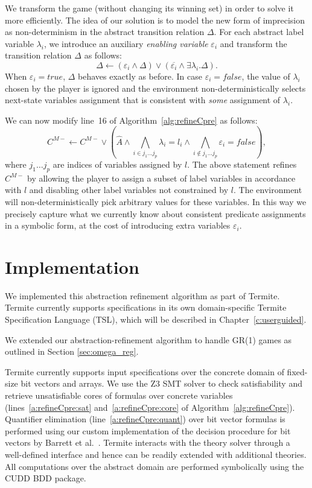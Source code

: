 We transform the game (without changing its winning set) in order to solve it more efficiently.  The idea of our solution is to model the new form of imprecision as non-determinism in the abstract transition relation $\Delta$.  For each abstract label variable $\lambda_i$, we introduce an auxiliary \emph{enabling variable} $\varepsilon_i$ and transform the transition relation $\Delta$ as follows:
$$
\Delta \gets (\varepsilon_i \land \Delta) \lor (\overline{\varepsilon_i} \land \exists \lambda_i. \Delta).
$$
When $\varepsilon_i=true$, $\Delta$ behaves exactly as before.  In case $\varepsilon_i=false$, the value of $\lambda_i$ chosen by the player is ignored and the environment non-deterministically selects next-state variables assignment that is consistent with \emph{some} assignment of $\lambda_i$. 

We can now modify line~16 of Algorithm~\ref{alg:refineCpre} as follows:
$$
C^{M-} \gets C^{M-} \lor (\hat{A}\land \bigwedge_{i\in{j_1\ldots j_p}}\lambda_i=l_i \land \bigwedge_{i\not\in{j_1\ldots j_p}}\varepsilon_i=false),
$$
where $j_1\ldots j_p$ are indices of variables assigned by $l$.  The above statement refines $C^{M-}$ by allowing the player to assign a subset of label variables in accordance with $l$ and disabling other label variables not constrained by $l$.  The environment will non-deterministically pick arbitrary values for these variables.  In this way we precisely capture what we currently know about consistent predicate assignments in a symbolic form, at the cost of introducing extra variables $\varepsilon_i$.

\section{Implementation}
We implemented this abstraction refinement algorithm as part of Termite. Termite currently supports specifications in its own domain-specific Termite Specification Language (TSL), which will be described in Chapter~\ref{c:userguided}.

We extended our abstraction-refinement algorithm to handle GR(1) games as outlined in Section \ref{sec:omega_reg}.

Termite currently supports input specifications over the concrete domain of fixed-size bit vectors and arrays.  We use the Z3 SMT solver to check satisfiability and retrieve unsatisfiable cores of formulas over concrete variables (lines~\ref{a:refineCpre:sat} and~\ref{a:refineCpre:core} of Algorithm~\ref{alg:refineCpre}).  Quantifier elimination (line~\ref{a:refineCpre:quant}) over bit vector formulas is performed using our custom implementation of the decision procedure for bit vectors by Barrett et al.~\cite{Barrett_DL_98}.  Termite interacts with the theory solver through a well-defined interface and hence can be readily extended with additional theories.  All computations over the abstract domain are performed symbolically using the CUDD BDD package.  

